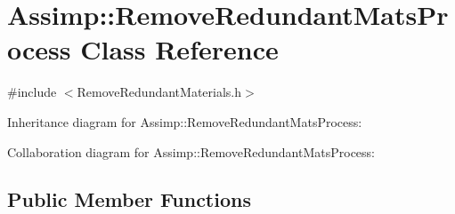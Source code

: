 \hypertarget{class_assimp_1_1_remove_redundant_mats_process}{\section{Assimp\+:\+:Remove\+Redundant\+Mats\+Process Class Reference}
\label{class_assimp_1_1_remove_redundant_mats_process}
}


{\ttfamily \#include $<$Remove\+Redundant\+Materials.\+h$>$}



Inheritance diagram for Assimp\+:\+:Remove\+Redundant\+Mats\+Process\+:


Collaboration diagram for Assimp\+:\+:Remove\+Redundant\+Mats\+Process\+:
\subsection*{Public Member Functions}
